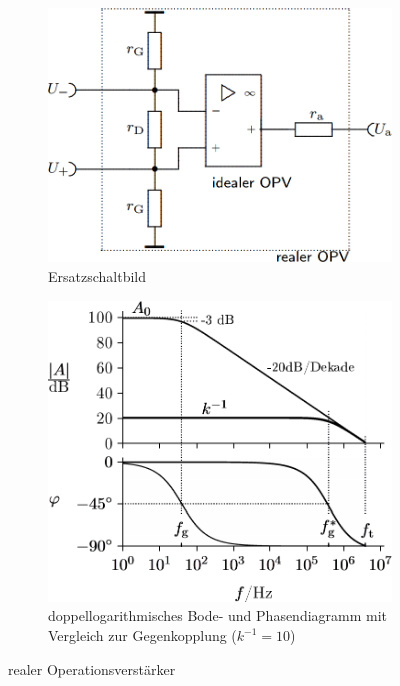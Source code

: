 \documentclass[numbers=noenddot,12pt,a4paper]{scrartcl}
\begin{document}
\begin{figure}[H]
\centering
\begin{subfigure}[b]{0.48\textwidth}
\centering
\includegraphics[width=\textwidth]{realopv.png}
\caption{Ersatzschaltbild \\ \vspace{2.6em}} \label{img:ersatzopv}
\end{subfigure}
\begin{subfigure}[b]{0.48\textwidth}
\centering
\includegraphics[width=\textwidth]{bodedia.png}
\caption{doppellogarithmisches Bode- und Phasendiagramm mit Vergleich zur Gegenkopplung ($k^{-1}=10$)} \label{img:bode}
\end{subfigure}
\caption{realer Operationsverstärker}
\end{figure}
\end{document}
